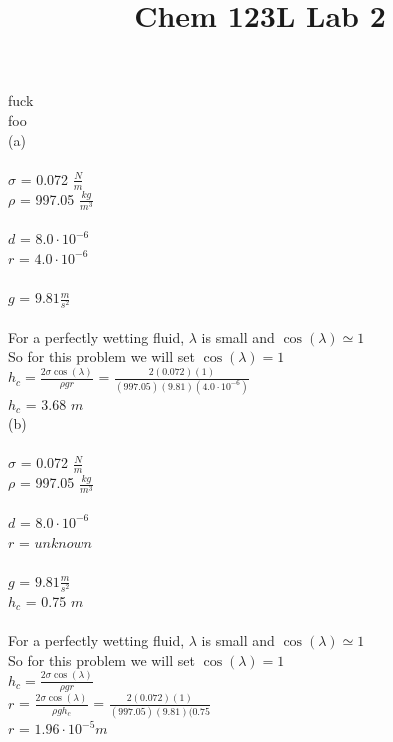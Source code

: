 \documentclass[a4paper,12pt]{article}
\begin{document}
\title{Chem 123L Lab 2}
fuck\\
\fontsize{16}{20}\selectfont
\noindent
foo\\
\fontsize{12}{12}\selectfont
(a)\\~\\
$\sigma$ = 0.072 $\frac{N}{m}$\\
$\rho$ = 997.05 $\frac{kg}{m^3}$\\~\\
$d$ = $8.0\cdot10^{-6}$\\
$r$ = $4.0\cdot10^{-6}$\\~\\
$g$ = $9.81 \frac{m}{s^2}$\\~\\
For a perfectly wetting fluid, $\lambda$ is small and $\cos(\lambda)\simeq1$\\
So for this problem we will set $\cos(\lambda) = 1$\\[3\baselineskip]
\fontsize{14}{16}\selectfont
$h_{c} = \frac{2\sigma\cos(\lambda)}{\rho g r}$ = $\frac{2(0.072)(1)}{(997.05)(9.81)(4.0\cdot10^{-6})}$\\
$h_{c}$ = 3.68 $m$\\[3\baselineskip]
\fontsize{12}{12}\selectfont
(b)\\~\\
$\sigma$ = 0.072 $\frac{N}{m}$\\
$\rho$ = 997.05 $\frac{kg}{m^3}$\\~\\
$d$ = $8.0\cdot10^{-6}$\\
$r$ = $unknown$\\~\\
$g$ = $9.81 \frac{m}{s^2}$\\
$h_{c}$ = 0.75 $m$\\~\\
For a perfectly wetting fluid, $\lambda$ is small and $\cos(\lambda)\simeq1$\\
So for this problem we will set $\cos(\lambda) = 1$\\[3\baselineskip]
\fontsize{14}{16}
$h_{c} = \frac{2\sigma\cos(\lambda)}{\rho g r}$\\
$r$ = $\frac{2\sigma\cos(\lambda)}{\rho g h_{c}}$ = $\frac{2(0.072)(1)}{(997.05)(9.81)(0.75}$\\
$r$ = $1.96\cdot10^{-5} m$
\end{document}
